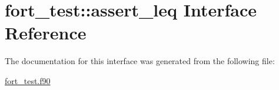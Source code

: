 \hypertarget{interfacefort__test_1_1assert__leq}{}\section{fort\+\_\+test\+:\+:assert\+\_\+leq Interface Reference}
\label{interfacefort__test_1_1assert__leq}


The documentation for this interface was generated from the following file\+:\begin{DoxyCompactItemize}
\item 
\hyperlink{fort__test_8f90}{fort\+\_\+test.\+f90}\end{DoxyCompactItemize}
